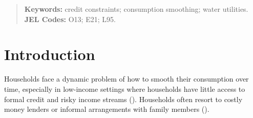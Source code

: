 \documentclass[12pt,table]{article}
\begin{document}
\begin{titlepage}
\begin{abstract}

















\vspace{1in}
\textbf{Keywords:} credit constraints; consumption smoothing; water utilities. \\
\textbf{JEL Codes:} O13; E21; L95. \\
\bigskip
\end{abstract}
\setcounter{page}{0}
\thispagestyle{empty}
\end{titlepage}
\pagebreak \newpage

\onehalfspacing

\section{Introduction}

Households face a dynamic problem of how to smooth their consumption over time, especially in low-income settings where households have little access to formal credit and risky income streams (\cite{morduch1995income}).  Households often resort to costly money lenders or informal arrangements with family members (\cite{banerjee2007economic}).  
\end{document}
